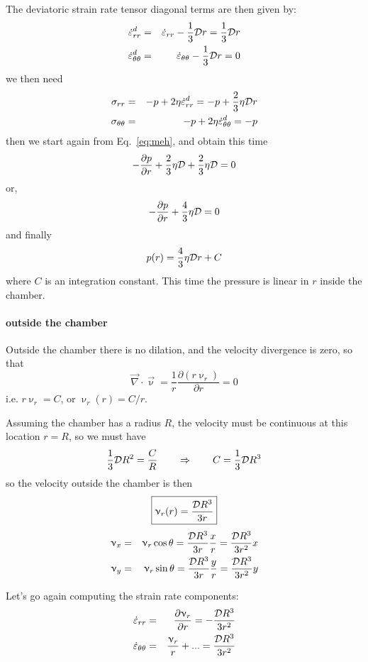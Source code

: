 The deviatoric strain rate tensor diagonal terms are then given by:
\begin{eqnarray}
\dot\varepsilon_{rr}^d  &=& 
\dot\varepsilon_{rr}  -\frac13  {\cal D} r 
=\frac13  {\cal D} r  \nonumber\\
\dot\varepsilon_{\theta\theta}^d  &=&
\dot\varepsilon_{\theta\theta}  -\frac13  {\cal D} r = 0 
\end{eqnarray}
we then need
\begin{eqnarray}
\sigma_{rr} &=& -p + 2 \eta \dot\varepsilon_{rr}^d  
= -p +  \frac23 \eta {\cal D}r \nonumber\\ 
\sigma_{\theta\theta} &=& -p + 2 \eta \dot\varepsilon_{\theta\theta} ^d 
= -p 
\end{eqnarray}
then we start again from Eq.~\eqref{eq:meh}, and obtain this time
\[
-\frac{\partial p}{\partial r} 
+  \frac23 \eta {\cal D} 
+ \frac23 \eta {\cal D} 
=0
\]
or,
\[
-\frac{\partial p}{\partial r} 
+  \frac43 \eta {\cal D} 
=0
\]
and finally 
\[
p(r) =  \frac43 \eta {\cal D}  r + C 
\]
where $C$ is an integration constant. 
This time the pressure is linear in $r$ inside the chamber.  



\paragraph{outside the chamber}

Outside the chamber there is no dilation, and the velocity divergence is zero, 
so that 
\[
\vec\nabla \cdot \vec\upnu = \frac{1}{r} \frac{\partial (r \upnu_r) }{\partial r} = 0
\]
i.e. $r \upnu_r = C$, or $\upnu_r(r) = C/r$.

Assuming the chamber has a radius $R$, the velocity must be continuous at this 
location $r=R$, so we must have 
\[
\frac{1}{3} {\cal D} R^2 = \frac{C}{R} 
\qquad
\Rightarrow
\qquad
C = \frac{1}{3} {\cal D} R^3 
\]
so the velocity outside the chamber is then 
\[
\boxed{
\upnu_r(r) = \frac{{\cal D} R^3 } {3r} 
}
\]
\begin{eqnarray}
\upnu_x &=& \upnu_r \cos\theta = \frac{{\cal D} R^3 } {3r} \frac{x}{r} = \frac{{\cal D} R^3 } {3r^2} x \\
\upnu_y &=& \upnu_r \sin\theta = \frac{{\cal D} R^3 } {3r} \frac{y}{r} = \frac{{\cal D} R^3 } {3r^2} y 
\end{eqnarray}



Let's go again computing the strain rate components:
\begin{eqnarray}
\dot\varepsilon_{rr} 
&=& \frac{\partial \upnu_r}{\partial r} 
= - \frac{{\cal D} R^3 } {3r^2} 
\\
\dot\varepsilon_{\theta\theta}
&=& \frac{\upnu_r}{r} + ...
= \frac{{\cal D} R^3 } {3r^2} 
\end{eqnarray}

